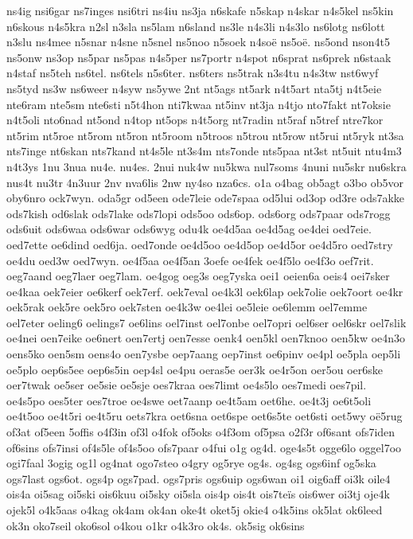 {ns4ig
nsi6gar
ns7inges
nsi6tri
ns4iu
ns3ja
n6skafe
n5skap
n4skar
n4s5kel
ns5kin
n6skous
n4s5kra
n2sl
n3sla
ns5lam
n6sland
ns3le
n4s3li
n4s3lo
ns6lotg
ns6lott
n3slu
ns4mee
n5snar
n4sne
n5snel
ns5noo
n5soek
n4soë
ns5oë.
ns5ond
nson4t5
ns5onw
ns3op
ns5par
ns5pas
n4s5per
ns7portr
n4spot
n6sprat
ns6prek
n6staak
n4staf
ns5teh
ns6tel.
ns6tels
n5s6ter.
ns6ters
ns5trak
n3s4tu
n4s3tw
nst6wyf
ns5tyd
ns3w
ns6weer
n4syw
ns5ywe
2nt
nt5ags
nt5ark
n4t5art
nta5tj
n4t5eie
nte6ram
nte5sm
nte6sti
n5t4hon
nti7kwaa
nt5inv
nt3ja
n4tjo
nto7fakt
nt7oksie
n4t5oli
nto6nad
nt5ond
n4top
nt5ops
n4t5org
nt7radin
nt5raf
n5tref
ntre7kor
nt5rim
nt5roe
nt5rom
nt5ron
nt5room
n5troos
n5trou
nt5row
nt5rui
nt5ryk
nt3sa
nts7inge
nt6skan
nts7kand
nt4s5le
nt3s4m
nts7onde
nts5paa
nt3st
nt5uit
ntu4m3
n4t3ys
1nu
3nua
nu4e.
nu4es.
2nui
nuk4w
nu5kwa
nul7soms
4nuni
nu5skr
nu6skra
nus4t
nu3tr
4n3uur
2nv
nva6lis
2nw
ny4so
nza6cs.
o1a
o4bag
ob5agt
o3bo
ob5vor
oby6nro
ock7wyn.
oda5gr
od5een
ode7leie
ode7spaa
od5lui
od3op
od3re
ods7akke
ods7kish
od6slak
ods7lake
ods7lopi
ods5oo
ods6op.
ods6org
ods7paar
ods7rogg
ods6uit
ods6waa
ods6war
ods6wyg
odu4k
oe4d5aa
oe4d5ag
oe4dei
oed7eie.
oed7ette
oe6dind
oed6ja.
oed7onde
oe4d5oo
oe4d5op
oe4d5or
oe4d5ro
oed7stry
oe4du
oed3w
oed7wyn.
oe4f5aa
oe4f5an
3oefe
oe4fek
oe4f5lo
oe4f3o
oef7rit.
oeg7aand
oeg7laer
oeg7lam.
oe4gog
oeg3s
oeg7yska
oei1
oeien6a
oeis4
oei7sker
oe4kaa
oek7eier
oe6kerf
oek7erf.
oek7eval
oe4k3l
oek6lap
oek7olie
oek7oort
oe4kr
oek5rak
oek5re
oek5ro
oek7sten
oe4k3w
oe4lei
oe5leie
oe6lemm
oel7emme
oel7eter
oeling6
oelings7
oe6lins
oel7inst
oel7onbe
oel7opri
oel6ser
oel6skr
oel7slik
oe4nei
oen7eike
oe6nert
oen7ertj
oen7esse
oenk4
oen5kl
oen7knoo
oen5kw
oe4n3o
oens5ko
oen5sm
oens4o
oen7ysbe
oep7aang
oep7inst
oe6pinv
oe4pl
oe5pla
oep5li
oe5plo
oep6s5ee
oep6s5in
oep4sl
oe4pu
oeras5e
oer3k
oe4r5on
oer5ou
oer6ske
oer7twak
oe5ser
oe5sie
oe5sje
oes7kraa
oes7limt
oe4s5lo
oes7medi
oes7pil.
oe4s5po
oes5ter
oes7troe
oe4swe
oet7aanp
oe4t5am
oet6he.
oe4t3j
oe6t5oli
oe4t5oo
oe4t5ri
oe4t5ru
oets7kra
oet6sna
oet6spe
oet6s5te
oet6sti
oet5wy
oë5rug
of3at
of5een
5offis
o4f3in
of3l
o4fok
of5oks
o4f3om
of5psa
o2f3r
of6sant
ofs7iden
of6sins
ofs7insi
of4s5le
of4s5oo
ofs7paar
o4fui
o1g
og4d.
oge4s5t
ogge6lo
oggel7oo
ogi7faal
3ogig
og1l
og4nat
ogo7steo
o4gry
og5rye
og4s.
og4sg
ogs6inf
og5ska
ogs7last
ogs6ot.
ogs4p
ogs7pad.
ogs7pris
ogs6uip
ogs6wan
oi1
oig6aff
oi3k
oile4
ois4a
oi5sag
oi5ski
ois6kuu
oi5sky
oi5sla
ois4p
ois4t
ois7teïs
ois6wer
oi3tj
oje4k
ojek5l
o4k5aas
o4kag
ok4am
ok4an
oke4t
oket5j
okie4
o4k5ins
ok5lat
ok6leed
ok3n
oko7seil
oko6sol
o4kou
o1kr
o4k3ro
ok4s.
ok5sig
ok6sins
}
